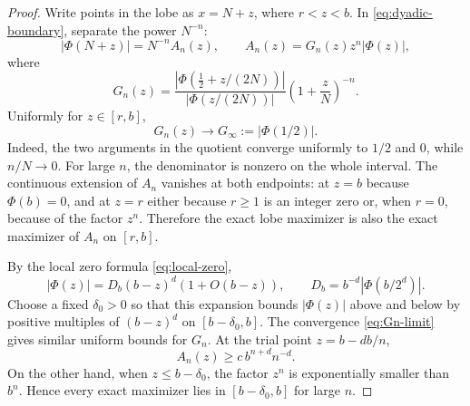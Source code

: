 \documentclass[11pt,oneside]{article}
\numberwithin{equation}{section}
\theoremstyle{definition}
\theoremstyle{remark}
\newcommand{\abs}[1]{\left|#1\right|}
\newcommand{\PhiUp}{\Phi}
\newcommand{\defeq}{\mathrel{:=}}
\begin{document}
\begin{proof}
Write points in the lobe as \(x=N+z\), where \(r<z<b\).  In
\eqref{eq:dyadic-boundary}, separate the power \(N^{-n}\):
\begin{equation}
 \abs{\PhiUp(N+z)}=N^{-n}A_n(z),
 \qquad
 A_n(z)=G_n(z)z^n\abs{\PhiUp(z)},
 \label{eq:valley-objective}
\end{equation}
where
\begin{equation}
 G_n(z)=
 \frac{\abs{\PhiUp(\tfrac12+z/(2N))}}
      {\abs{\PhiUp(z/(2N))}}
 \left(1+\frac zN\right)^{-n}.
 \label{eq:Gn-valley}
\end{equation}
Uniformly for \(z\in[r,b]\),
\begin{equation}
 G_n(z)\longrightarrow G_\infty\defeq\abs{\PhiUp(1/2)}.
 \label{eq:Gn-limit}
\end{equation}
Indeed, the two arguments in the quotient converge uniformly to \(1/2\) and \(0\), while
\(n/N\to0\).  For large \(n\), the denominator is nonzero on the whole interval.
The continuous extension of \(A_n\) vanishes at both endpoints: at \(z=b\) because
\(\PhiUp(b)=0\), and at \(z=r\) either because \(r\ge1\) is an integer zero or, when
\(r=0\), because of the factor \(z^n\).  Therefore the exact lobe maximizer is also the
exact maximizer of \(A_n\) on \([r,b]\).

By the local zero formula \eqref{eq:local-zero},
\begin{equation}
 \abs{\PhiUp(z)}
 =D_b(b-z)^d(1+O(b-z)),
 \qquad
 D_b=b^{-d}\abs{\PhiUp(b/2^d)}.
 \label{eq:valley-local-zero}
\end{equation}
Choose a fixed \(\delta_0>0\) so that this expansion bounds
\(\abs{\PhiUp(z)}\) above and below by positive multiples of \((b-z)^d\) on
\([b-\delta_0,b]\).  The convergence \eqref{eq:Gn-limit} gives similar uniform bounds for
\(G_n\).  At the trial point \(z=b-db/n\),
\[
 A_n(z)\ge c\,b^{n+d}n^{-d}.
\]
On the other hand, when \(z\le b-\delta_0\), the factor \(z^n\) is exponentially smaller
than \(b^n\).  Hence every exact maximizer lies in \([b-\delta_0,b]\) for large \(n\).


\end{proof}
\end{document}
